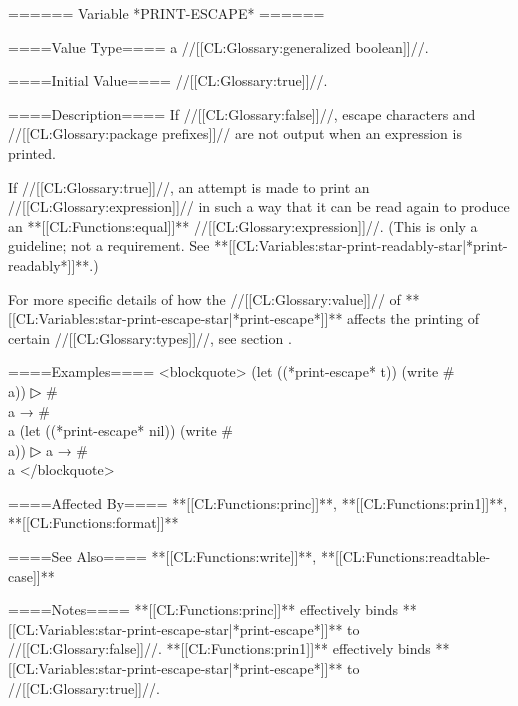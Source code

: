 ====== Variable *PRINT-ESCAPE* ======

====Value Type====
a //[[CL:Glossary:generalized boolean]]//.

====Initial Value====
//[[CL:Glossary:true]]//.

====Description====
If //[[CL:Glossary:false]]//, escape characters and //[[CL:Glossary:package prefixes]]// are not output when an expression is printed.


If //[[CL:Glossary:true]]//, an attempt is made to print an //[[CL:Glossary:expression]]// in such a way that it can be read again to produce an **[[CL:Functions:equal]]** //[[CL:Glossary:expression]]//. (This is only a guideline; not a requirement. See **[[CL:Variables:star-print-readably-star|*print-readably*]]**.)

For more specific details of how the //[[CL:Glossary:value]]// of **[[CL:Variables:star-print-escape-star|*print-escape*]]** affects the printing of certain //[[CL:Glossary:types]]//, see section {\secref\DefaultPrintObjMeths}.

====Examples==== <blockquote> (let ((*print-escape* t)) (write #\\a))
▷ #\\a → #\\a (let ((*print-escape* nil)) (write #\\a))
▷ a → #\\a </blockquote>

====Affected By====
**[[CL:Functions:princ]]**, **[[CL:Functions:prin1]]**, **[[CL:Functions:format]]**

====See Also====
**[[CL:Functions:write]]**, **[[CL:Functions:readtable-case]]**

====Notes====
**[[CL:Functions:princ]]** effectively binds **[[CL:Variables:star-print-escape-star|*print-escape*]]** to //[[CL:Glossary:false]]//. **[[CL:Functions:prin1]]** effectively binds **[[CL:Variables:star-print-escape-star|*print-escape*]]** to //[[CL:Glossary:true]]//.


